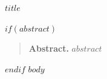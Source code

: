 \documentclass[11pt]{article}
\begin{document}
\begin{center}{\LARGE\bfseries $title$\par}\end{center}
\vspace{1em}
$if(abstract)$
\begin{quote}\small\noindent\textbf{Abstract.} $abstract$\end{quote}
\vspace{0.5em}
$endif$
$body$
\end{document}
